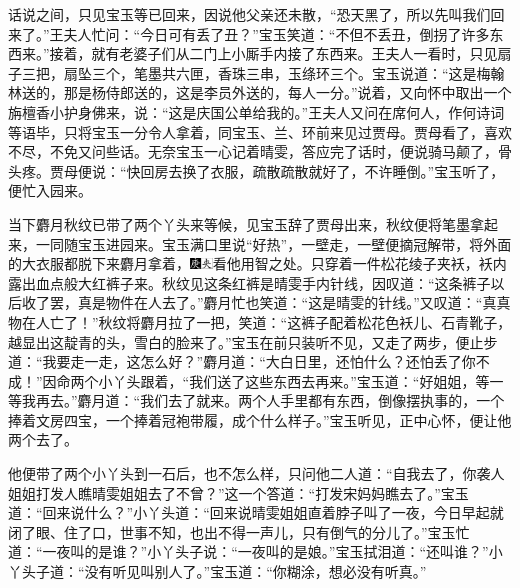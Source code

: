 话说之间，只见宝玉等已回来，因说他父亲还未散，``恐天黑了，所以先叫我们回来了。''王夫人忙问：``今日可有丢了丑？''宝玉笑道：``不但不丢丑，倒拐了许多东西来。''接着，就有老婆子们从二门上小厮手内接了东西来。王夫人一看时，只见扇子三把，扇坠三个，笔墨共六匣，香珠三串，玉绦环三个。宝玉说道：``这是梅翰林送的，那是杨侍郎送的，这是李员外送的，每人一分。''说着，又向怀中取出一个旃檀香小护身佛来，说：``这是庆国公单给我的。''王夫人又问在席何人，作何诗词等语毕，只将宝玉一分令人拿着，同宝玉、兰、环前来见过贾母。贾母看了，喜欢不尽，不免又问些话。无奈宝玉一心记着晴雯，答应完了话时，便说骑马颠了，骨头疼。贾母便说：``快回房去换了衣服，疏散疏散就好了，不许睡倒。''宝玉听了，便忙入园来。

当下麝月秋纹已带了两个丫头来等候，见宝玉辞了贾母出来，秋纹便将笔墨拿起来，一同随宝玉进园来。宝玉满口里说``好热''，一壁走，一壁便摘冠解带，将外面的大衣服都脱下来麝月拿着，{\includegraphics[width=3mm]{../Images/00004}\includegraphics[width=3mm]{../Images/00012}\footnotesize \kaishu 看他用智之处。}只穿着一件松花绫子夹袄，袄内露出血点般大红裤子来。秋纹见这条红裤是晴雯手内针线，因叹道：``这条裤子以后收了罢，真是物件在人去了。''麝月忙也笑道：``这是晴雯的针线。''又叹道：``真真物在人亡了！''秋纹将麝月拉了一把，笑道：``这裤子配着松花色袄儿、石青靴子，越显出这靛青的头，雪白的脸来了。''宝玉在前只装听不见，又走了两步，便止步道：``我要走一走，这怎么好？''麝月道：``大白日里，还怕什么？还怕丢了你不成！''因命两个小丫头跟着，``我们送了这些东西去再来。''宝玉道：``好姐姐，等一等我再去。''麝月道：``我们去了就来。两个人手里都有东西，倒像摆执事的，一个捧着文房四宝，一个捧着冠袍带履，成个什么样子。''宝玉听见，正中心怀，便让他两个去了。

他便带了两个小丫头到一石后，也不怎么样，只问他二人道：``自我去了，你袭人姐姐打发人瞧晴雯姐姐去了不曾？''这一个答道：``打发宋妈妈瞧去了。''宝玉道：``回来说什么？''小丫头道：``回来说晴雯姐姐直着脖子叫了一夜，今日早起就闭了眼、住了口，世事不知，也出不得一声儿，只有倒气的分儿了。''宝玉忙道：``一夜叫的是谁？''小丫头子说：``一夜叫的是娘。''宝玉拭泪道：``还叫谁？''小丫头子道：``没有听见叫别人了。''宝玉道：``你糊涂，想必没有听真。''

